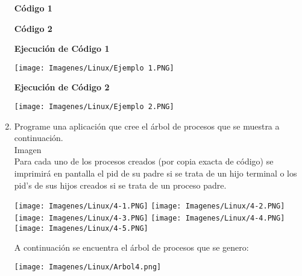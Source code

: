 \documentclass[12pt]{article}
\begin{document}
\begin{enumerate}
            \textbf{Código 1}
            
            \textbf{Código 2}
            
            \newpage
            \textbf{Ejecución de Código 1}
             \begin{center}
                \texttt{[image: Imagenes/Linux/Ejemplo 1.PNG]}
            \end{center}
            \textbf{Ejecución de Código 2}
            \begin{center}
                \texttt{[image: Imagenes/Linux/Ejemplo 2.PNG]}
            \end{center}
        \newpage
        \item Programe una aplicación que cree el árbol de procesos que se muestra a continuación. \\
        Imagen \\
        Para cada uno de los procesos creados (por copia exacta de código) se imprimirá en pantalla el pid de su padre si se trata de un hijo terminal o los pid’s de sus hijos creados si se trata de un proceso padre.
        
            \begin{center}
                \texttt{[image: Imagenes/Linux/4-1.PNG]}
                \texttt{[image: Imagenes/Linux/4-2.PNG]}
                \texttt{[image: Imagenes/Linux/4-3.PNG]}
                \texttt{[image: Imagenes/Linux/4-4.PNG]}
                \texttt{[image: Imagenes/Linux/4-5.PNG]}
            \end{center}
        \newpage
        A continuación se encuentra el árbol de procesos que se genero:
        
        
        \texttt{[image: Imagenes/Linux/Arbol4.png]}
        

\end{enumerate}
\end{document}
